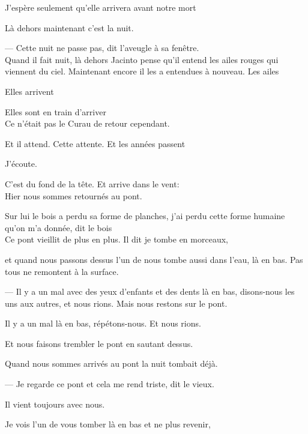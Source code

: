 J'espère seulement qu'elle arrivera avant notre mort

\pagebreak

\vspace*{4cm}

Là dehors maintenant c'est la nuit.

--- Cette nuit ne passe pas, dit l'aveugle à sa fenêtre.\\

Quand il fait nuit, là dehors Jacinto pense qu'il entend les ailes
rouges qui viennent du ciel. Maintenant encore il les a entendues à
nouveau. Les ailes

Elles arrivent

Elles sont en train d'arriver\\

Ce n'était pas le Curau de retour cependant.

Et il attend. Cette attente. Et les années passent

\clearpage
\thispagestyle{empty}
\movetoevenpage

\vspace*{4cm}

J'écoute.

C'est du fond de la tête. Et arrive dans le vent:\\

Hier nous sommes retournés au pont.

Sur lui le bois a perdu sa forme de planches, j'ai perdu cette forme
humaine qu'on m'a donnée, dit le bois\\

Ce pont vieillit de plus en plus. Il dit je tombe en morceaux,

et quand nous passons dessus l'un de nous tombe aussi dans l'eau, là en
bas. Pas tous ne remontent à la surface.

--- Il y a un mal avec des yeux d'enfants et des dents là en bas,
disons-nous les uns aux autres, et nous rions. Mais nous restons sur le
pont.

Il y a un mal là en bas, répétons-nous. Et nous rions.

Et nous faisons trembler le pont en sautant dessus.

Quand nous sommes arrivés au pont la nuit tombait déjà.

--- Je regarde ce pont et cela me rend triste, dit le vieux.

Il vient toujours avec nous.

Je vois l'un de vous tomber là en bas et ne plus revenir,

